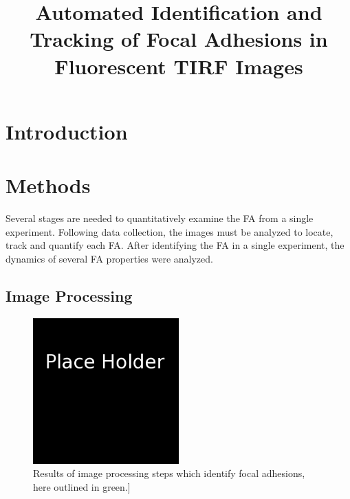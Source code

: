 \documentclass[letterpaper,twocolumn]{article}
\title{Automated Identification and Tracking of Focal Adhesions in Fluorescent TIRF Images}
\begin{document}
\maketitle

\begin{abstract}

\end{abstract}

\section*{Introduction}

\section*{Methods}

Several stages are needed to quantitatively examine the FA from a single experiment. Following data collection, the images must be analyzed to locate, track and quantify each FA. After identifying the FA in a single experiment, the dynamics of several FA properties were analyzed. 

\subsection*{Image Processing}

\begin{figure}[htbp]
\begin{center}
\includegraphics[width=0.5\textwidth]{figures/place_holder}
\caption{Results of image processing steps which identify focal adhesions, here outlined in green.]}
\label{cell_sample}
\end{center}
\end{figure}
\end{document}
